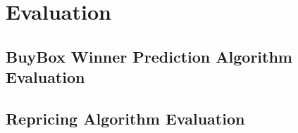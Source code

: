 \section{Evaluation}
\label{sec:Evaluation}

\subsection{BuyBox Winner Prediction Algorithm Evaluation}
\label{sec:BuyBoxEvaluation}

\subsection{Repricing Algorithm Evaluation}
\label{sec:RepricingEvaluation}